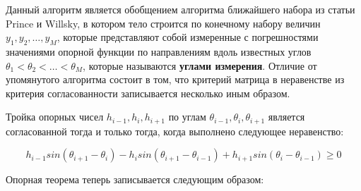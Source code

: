 \documentclass[a4paper, 12pt, titlepage]{article}
\theoremstyle{definition}
\theoremstyle{plain}
\begin{document}
Данный алгоритм является обобщением алгоритма ближайшего набора из статьи Prince
и Willsky, в котором тело строится по конечному набору величин
$y_{1}, y_{2}, \ldots, y_{M}$,  которые представляют собой измеренные с
погрешностями значениями опорной функции по направлениям вдоль известных углов
$\theta_{1} < \theta_{2} < \ldots < \theta_{M}$, которые называются
\textbf{углами измерения}. Отличие от упомянутого алгоритма состоит в том, что
критерий матрица в неравенстве из критерия согласованности записывается
несколько иным образом.

Тройка опорных чисел $h_{i - 1}, h_{i}, h_{i + 1}$ по углам $\theta_{i - 1},
\theta_{i}, \theta_{i + 1}$ является согласованной тогда и только тогда, когда
выполнено следующее неравенство:

\begin{equation}
h_{i - 1} sin(\theta_{i + 1} - \theta_{i}) -
h_{i} sin(\theta_{i + 1} - \theta_{i - 1}) +
h_{i + 1} sin(\theta_{i} - \theta_{i - 1}) \geq 0
\end{equation}

Опорная теорема теперь записывается следующим образом:
\end{document}
